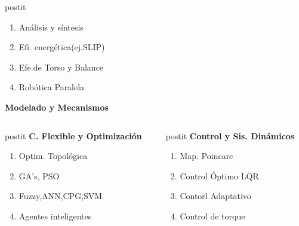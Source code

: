 \begin{frame}[label=resumen]
\begin{center}
{\begin{columns}[c]
\begin{column}{3cm}
\begin{beamercolorbox}[sep=0.5em,wd=3cm,rounded=true,center,shadow=true]{postit}
            \begin{enumerate}\tiny
            \item An\'alisis y s\'intesis
            \item Efi. energ\'etica(ej.SLIP)
            \item Efe.de Torso y Balance
            \item Rob\'otica Paralela
            \end{enumerate}
            \textbf{Modelado y Mecanismos}
          \end{beamercolorbox}
        \end{column}
      \end{columns}
      \vspace{1.0cm}
      \begin{columns}[c]
        \begin{column}{3cm}
          \begin{beamercolorbox}[sep=0.5em,wd=3cm,rounded=true,center,shadow=true]{postit}
            \textbf{C. Flexible y Optimizaci\'on}
            \begin{enumerate}\tiny
            \item Optim. Topol\'ogica
            \item GA's, PSO
            \item Fuzzy,ANN,CPG,SVM
            \item Agentes inteligentes
            \end{enumerate}
          \end{beamercolorbox}
        \end{column}
        \begin{column}{3cm}
          \begin{beamercolorbox}[sep=0.5em,wd=3cm,rounded=true,center,shadow=true]{postit}
            \textbf{Control y Sis. Din\'amicos}
            \begin{enumerate}\tiny
            \item Map. Poincare
            \item Control \'Optimo LQR
            \item Contorl Adaptativo
            \item Control de torque
            \end{enumerate}

\end{beamercolorbox}
\end{column}
\end{columns}}
\end{center}
\end{frame}
